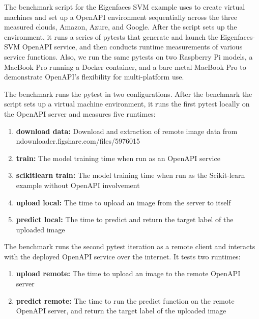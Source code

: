 The benchmark script for the Eigenfaces SVM example uses \Cloudmesh to
create virtual machines and set up a \Cloudmesh OpenAPI environment
sequentially across the three measured clouds, Amazon, Azure, and
Google. After the script sets up the environment, it runs a series of
pytests that generate and launch the Eigenfaces-SVM OpenAPI service,
and then conducts runtime measurements of various service
functions. Also, we run the same pytests on two Raspberry Pi models, a
MacBook Pro running a Docker container, and a bare metal MacBook Pro
to demonstrate \Cloudmesh OpenAPI's flexibility for multi-platform
use.

The benchmark runs the pytest in two configurations. After the benchmark
the script sets up a virtual machine environment, it runs the first pytest
locally on the OpenAPI server and measures five runtimes:

\begin{enumerate}
\def\labelenumi{\arabic{enumi}.}
\item \textbf{download data:} Download and extraction of remote image data from
  ndownloader.figshare.com/files/5976015
\item \textbf{train:} 
  The model training time when run as an OpenAPI service
\item \textbf{scikitlearn train:} 
  The model training time when run as the Scikit-learn example without
  OpenAPI involvement
\item \textbf{upload local:} 
  The time to upload an image from the server to itself
\item \textbf{predict local:} 
  The time to predict and return the target label of the uploaded image
\end{enumerate}

The benchmark runs the second pytest iteration as a remote client and
interacts with the deployed OpenAPI service over the internet. It
tests two runtimes:

\begin{enumerate}
\def\labelenumi{\arabic{enumi}.}
\item \textbf{upload remote:} 
  The time to upload an image to the remote OpenAPI server
\item \textbf{predict remote:} 
  The time to run the predict function on the remote OpenAPI server, and
  return the target label of the uploaded image
\end{enumerate}

